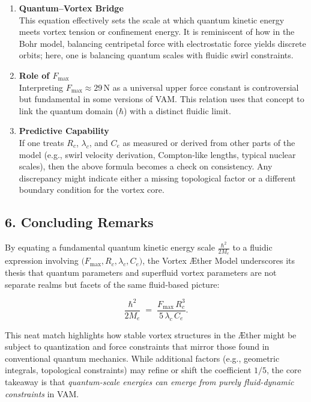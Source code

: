 \begin{enumerate}
    \item \textbf{Quantum–Vortex Bridge} \\
    This equation effectively sets the scale at which quantum kinetic energy meets vortex tension or confinement energy. It is reminiscent of how in the Bohr model, balancing centripetal force with electrostatic force yields discrete orbits; here, one is balancing quantum scales with fluidic swirl constraints.
    \item \textbf{Role of \(F_{\max}\)} \\
    Interpreting \(F_{\max}\approx 29\,\mathrm{N}\) as a universal upper force constant is controversial but fundamental in some versions of VAM. This relation uses that concept to link the quantum domain (\(\hbar\)) with a distinct fluidic limit.
    \item \textbf{Predictive Capability} \\
    If one treats \(R_c\), \(\lambda_c\), and \(C_e\) as measured or derived from other parts of the model (e.g., swirl velocity derivation, Compton-like lengths, typical nuclear scales), then the above formula becomes a check on consistency. Any discrepancy might indicate either a missing topological factor or a different boundary condition for the vortex core.
\end{enumerate}

\subsection*{6. Concluding Remarks}

By equating a fundamental quantum kinetic energy scale \(\tfrac{\hbar^2}{2M_e}\) to a fluidic expression involving \(\bigl(F_{\max}, R_c, \lambda_c, C_e\bigr)\), the Vortex Æther Model underscores its thesis that quantum parameters and superfluid vortex parameters are not separate realms but facets of the same fluid-based picture:

\[
    \boxed{
        \frac{\hbar^2}{2 M_e}
        \;=\;
        \frac{F_{\max} \, R_c^3}{5 \,\lambda_c\,C_e}.
    }
\]

This neat match highlights how stable vortex structures in the Æther might be subject to quantization and force constraints that mirror those found in conventional quantum mechanics. While additional factors (e.g., geometric integrals, topological constraints) may refine or shift the coefficient \(1/5\), the core takeaway is that \textit{quantum-scale energies can emerge from purely fluid-dynamic constraints} in VAM.